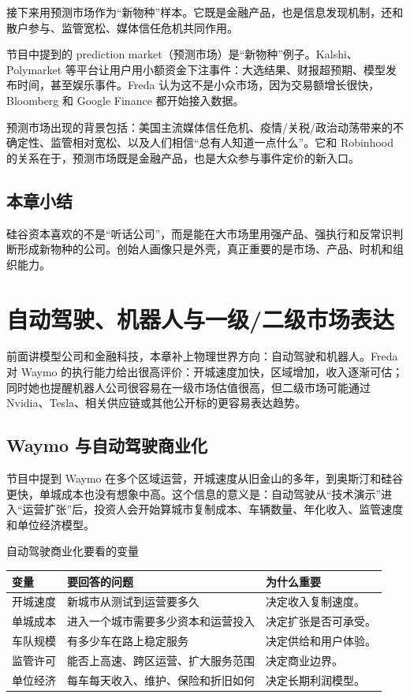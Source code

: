 \documentclass[a4paper]{article}
\begin{document}
接下来用预测市场作为“新物种”样本。它既是金融产品，也是信息发现机制，还和散户参与、监管宽松、媒体信任危机共同作用。

节目中提到的 prediction market（预测市场）是“新物种”例子。Kalshi、Polymarket 等平台让用户用小额资金下注事件：大选结果、财报超预期、模型发布时间，甚至娱乐事件。Freda 认为这不是小众市场，因为交易额增长很快，Bloomberg 和 Google Finance 都开始接入数据。

预测市场出现的背景包括：美国主流媒体信任危机、疫情/关税/政治动荡带来的不确定性、监管相对宽松、以及人们相信“总有人知道一点什么”。它和 Robinhood 的关系在于，预测市场既是金融产品，也是大众参与事件定价的新入口。

\subsection{本章小结}

硅谷资本喜欢的不是“听话公司”，而是能在大市场里用强产品、强执行和反常识判断形成新物种的公司。创始人画像只是外壳，真正重要的是市场、产品、时机和组织能力。

\section{自动驾驶、机器人与一级/二级市场表达}

前面讲模型公司和金融科技，本章补上物理世界方向：自动驾驶和机器人。Freda 对 Waymo 的执行能力给出很高评价：开城速度加快，区域增加，收入逐渐可估；同时她也提醒机器人公司很容易在一级市场估值很高，但二级市场可能通过 Nvidia、Tesla、相关供应链或其他公开标的更容易表达趋势。

\subsection{Waymo 与自动驾驶商业化}

节目中提到 Waymo 在多个区域运营，开城速度从旧金山的多年，到奥斯汀和硅谷更快，单城成本也没有想象中高。这个信息的意义是：自动驾驶从“技术演示”进入“运营扩张”后，投资人会开始算城市复制成本、车辆数量、年化收入、监管速度和单位经济模型。

\begin{knowledgebox}{自动驾驶商业化要看的变量}
\begin{tabularx}{\textwidth}{p{}p{}X}
\toprule
变量 & 要回答的问题 & 为什么重要 \\
\midrule
开城速度 & 新城市从测试到运营要多久 & 决定收入复制速度。 \\
单城成本 & 进入一个城市需要多少资本和运营投入 & 决定扩张是否可承受。 \\
车队规模 & 有多少车在路上稳定服务 & 决定供给和用户体验。 \\
监管许可 & 能否上高速、跨区运营、扩大服务范围 & 决定商业边界。 \\
单位经济 & 每车每天收入、维护、保险和折旧如何 & 决定长期利润模型。 \\
\bottomrule
\end{tabularx}
\end{knowledgebox}
\end{document}
